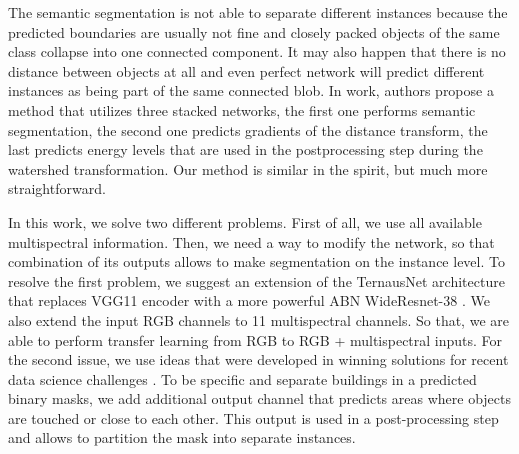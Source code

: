 \documentclass[10pt,twocolumn,letterpaper]{article}
\begin{document}
The semantic segmentation is not able to separate different instances because the predicted boundaries are usually not fine and closely packed objects of the same class collapse into one connected component. It may also happen that there is no distance between objects at all and even perfect network will predict different instances as being part of the same connected blob. In work, \cite{bai2017deep} authors propose a method that utilizes three stacked networks, the first one performs semantic segmentation, the second one predicts gradients of the distance transform, the last predicts energy levels that are used in the postprocessing step during the watershed transformation. Our method is similar in the spirit, but much more straightforward. 

In this work, we solve two different problems. First of all, we  use all available multispectral information. Then, we need a way to modify the network, so that combination of its outputs  allows to make segmentation on the instance level. To resolve the first problem, we suggest an extension of the TernausNet architecture \cite{iglovikov2018ternausnet} that replaces VGG11 encoder with a more powerful ABN WideResnet-38 \cite{bulo2017place}. We also extend the input RGB channels to 11 multispectral channels. So that, we are able to perform transfer learning from RGB to RGB + multispectral inputs. For the second issue, we use ideas that were developed in winning solutions for recent data science challenges \cite{goldberg2018urban, dsbowl2018}. To be specific and separate buildings in a predicted binary masks, we add additional output channel that predicts areas where objects are touched or close to each other. This output is used in a post-processing step and allows to partition the mask into separate instances. 

\end{document}
